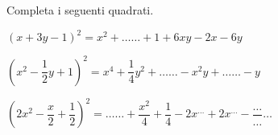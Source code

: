 \begin{esercizio}
 \label{ese:11.11}
Completa i seguenti quadrati.

\begin{enumeratea}
\spazielenx
\item $\left(x+3y-1\right)^{2}=x^{2}+\ldots \ldots +1+6xy-2x-6y$
\item 
$\left(x^{2}-\dfrac{1}{2}y+1\right)^{2}=x^{4}+\dfrac{1}{4}y^{2}+\ldots\ldots 
-x^{2}y+\ldots\ldots -y$
\item $\left(2x^{2}-\dfrac{x}{2}+\dfrac{1}{2}\right)^{2}=\ldots\ldots 
+\dfrac{x^{2}}{4}%
+\dfrac{1}{4}-2x^{\ldots }+2x^{\ldots}-\dfrac{\ldots}{\ldots}\ldots $
\end{enumeratea}
\end{esercizio}
% 
% 
% 
% 
% 
